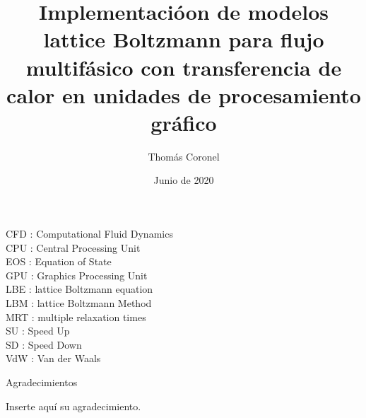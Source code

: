 \documentclass[12pt,papel,oneside]{ibtesis}
\title{Implementacióon de modelos lattice Boltzmann para flujo multifásico con transferencia de calor en unidades de procesamiento gráfico}
\author{Thomás Coronel}
\date{Junio de 2020}
\begin{document}

\begin{preliminary}





\tableofcontents                %

\begin{abreviaturas}
	
	CFD : Computational Fluid Dynamics\\
	
	CPU : Central Processing Unit\\
	
	EOS : Equation of State\\
	
	GPU : Graphics Processing Unit\\
	
	LBE : lattice Boltzmann equation\\
	
	LBM : lattice Boltzmann Method\\
	
	MRT : multiple relaxation times\\
	
	SU  : Speed Up\\
	
	SD : Speed Down\\
	
	VdW : Van der Waals\\
	
	
\end{abreviaturas}

\end{preliminary}








\appendix
%
%
%
%
%


\begin{biblio}

\end{biblio}


\begin{postliminary}

\listoffigures                  %

\listoftables                   %

\begin{seccion}{Agradecimientos}
\begin{small}	

Inserte aquí su agradecimiento.

\end{small}


\end{seccion}


\end{postliminary}
\end{document}
